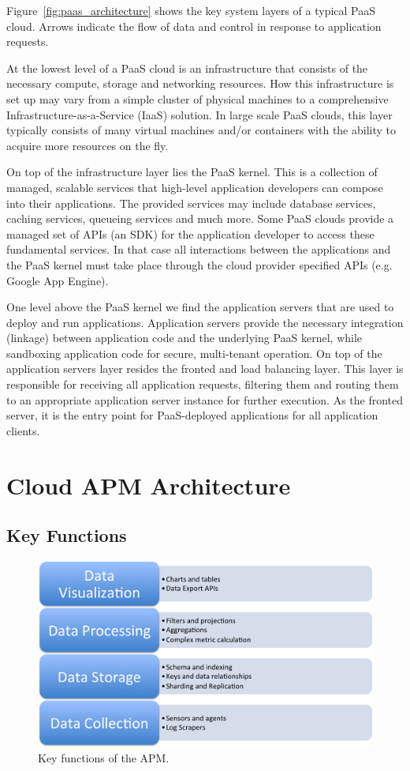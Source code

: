 \documentclass[11pt]{article}
\begin{document}
Figure~\ref{fig:paas_architecture} shows the key system layers of a typical PaaS cloud. Arrows indicate
the flow of data and control in response to application requests.

At the lowest level of a PaaS cloud is an infrastructure that consists of the necessary compute, storage
and networking resources. How this infrastructure is set up may vary from a simple cluster of physical 
machines to a comprehensive Infrastructure-as-a-Service (IaaS) solution. In large scale PaaS clouds,
this layer typically consists of many virtual machines and/or containers with the ability to acquire more
resources on the fly.

On top of the infrastructure layer lies the PaaS kernel. This is a collection of managed, scalable
services that high-level application developers can compose into their applications. The provided services
may include database services, caching services, queueing services and much more. Some PaaS clouds
provide a managed set of APIs (an SDK) for the application developer to access these fundamental services. 
In that case all interactions between the applications and the PaaS kernel must take place through
the cloud provider specified APIs (e.g. Google App Engine). 

One level above the PaaS kernel we find the application servers that are used to deploy and run
applications. Application servers provide the necessary integration (linkage) between application code and the
underlying PaaS kernel, while sandboxing application code for secure, multi-tenant operation. On top
of the application servers layer resides the fronted and load balancing layer. This layer is responsible
for receiving all application requests, filtering them and routing them to an appropriate application
server instance for further execution. As the fronted server, it is the entry point for PaaS-deployed
applications for all application clients.

\section{Cloud APM Architecture}
\subsection{Key Functions}
\begin{figure}
\centering
\includegraphics[scale=0.5]{apm_functions}
\caption{Key functions of the APM.}
\label{fig:apm_functions}
\end{figure}
\end{document}
